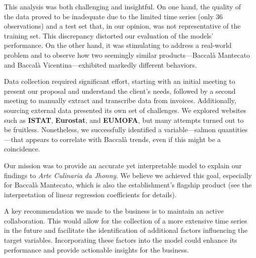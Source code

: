 \documentclass[10pt,twocolumn,letterpaper]{article}
\begin{document}
This analysis was both challenging and insightful. 
On one hand, the quality of the data proved to be inadequate due to the limited time series (only $36$ observations) and a test set that, in our opinion, was not representative of the training set. This discrepancy distorted our evaluation of the models’ performance. 
On the other hand, it was stimulating to address a real-world problem and to observe how two seemingly similar products—Baccalà Mantecato and Baccalà Vicentina—exhibited markedly different behaviors.

Data collection required significant effort, starting with an initial meeting to present our proposal and understand the client’s needs, followed by a second meeting to manually extract and transcribe data from invoices. Additionally, sourcing external data presented its own set of challenges. 
We explored websites such as \textbf{ISTAT}, \textbf{Eurostat}, and \textbf{EUMOFA}, but many attempts turned out to be fruitless. 
Nonetheless, we successfully identified a variable—salmon quantities—that appears to correlate with Baccalà trends, even if this might be a coincidence.

Our mission was to provide an accurate yet interpretable model to explain our findings to \textit{Arte Culinaria da Jhonny}. 
We believe we achieved this goal, especially for Baccalà Mantecato, which is also the establishment’s flagship product (see the interpretation of linear regression coefficients for details).

A key recommendation we made to the business is to maintain an active collaboration. 
This would allow for the collection of a more extensive time series in the future and facilitate the identification of additional factors influencing the target variables. 
Incorporating these factors into the model could enhance its performance and provide actionable insights for the business.
\end{document}
